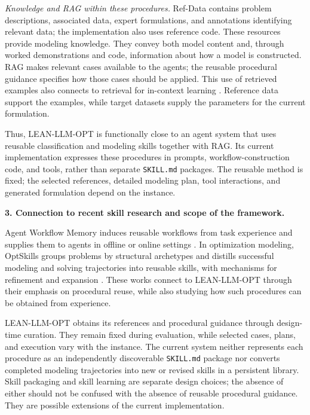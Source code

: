 \documentclass[11pt]{article}
\begin{document}
{\emph{Knowledge and RAG within these procedures.}
Ref-Data contains problem descriptions, associated data, expert
formulations, and annotations identifying relevant data; the
implementation also uses reference code. These resources provide
modeling knowledge. They convey both model content and, through
worked demonstrations and code, information about how a model is
constructed. RAG makes relevant cases available to the agents;
the reusable procedural guidance specifies how those cases
should be applied. This use of retrieved examples also connects
to retrieval for in-context learning \citep{ae1_rubin2022epr}.
Reference data support the examples, while target datasets supply
the parameters for the current formulation.

Thus, LEAN-LLM-OPT is functionally close to an agent system that
uses reusable classification and modeling skills together with
RAG. Its current implementation expresses these procedures in
prompts, workflow-construction code, and tools, rather than
separate \texttt{SKILL.md} packages. The reusable method is fixed;
the selected references, detailed modeling plan, tool interactions,
and generated formulation depend on the instance.

\medskip
\noindent\textbf{3. Connection to recent skill research and scope of the framework.}

Agent Workflow Memory induces reusable workflows from task
experience and supplies them to agents in offline or online
settings \citep{ae1_wang2025awm}. In optimization modeling,
OptSkills groups problems by structural archetypes and distills
successful modeling and solving trajectories into reusable
skills, with mechanisms for refinement and expansion
\citep{ae1_yang2026optskills}. These works connect to LEAN-LLM-OPT
through their emphasis on procedural reuse, while also studying
how such procedures can be obtained from experience.

LEAN-LLM-OPT obtains its references and procedural guidance
through design-time curation. They remain fixed during evaluation,
while selected cases, plans, and execution vary with the instance.
The current system neither represents each procedure as an
independently discoverable \texttt{SKILL.md} package nor converts
completed modeling trajectories into new or revised skills in a
persistent library. Skill packaging and skill learning are separate
design choices; the absence of either should not be confused with
the absence of reusable procedural guidance. They are possible
extensions of the current implementation.

}
\end{document}
